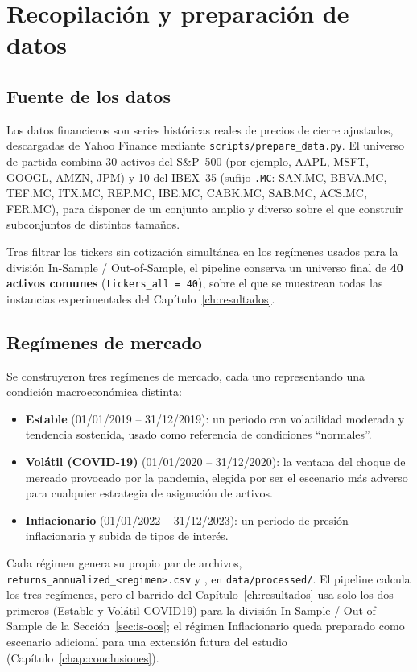 \section{Recopilación y preparación de datos}
\label{sec:datos}

\subsection{Fuente de los datos}

Los datos financieros son series históricas reales de precios de cierre ajustados, descargadas de Yahoo Finance mediante \texttt{scripts/prepare\_data.py}. El universo de partida combina 30 activos del S\&P~500 (por ejemplo, AAPL, MSFT, GOOGL, AMZN, JPM) y 10 del IBEX~35 (sufijo \texttt{.MC}: SAN.MC, BBVA.MC, TEF.MC, ITX.MC, REP.MC, IBE.MC, CABK.MC, SAB.MC, ACS.MC, FER.MC), para disponer de un conjunto amplio y diverso sobre el que construir subconjuntos de distintos tamaños.

Tras filtrar los tickers sin cotización simultánea en los regímenes usados para la división In-Sample / Out-of-Sample, el pipeline conserva un universo final de \textbf{40 activos comunes} (\texttt{tickers\_all = 40}), sobre el que se muestrean todas las instancias experimentales del Capítulo~\ref{ch:resultados}.

\subsection{Regímenes de mercado}

Se construyeron tres regímenes de mercado, cada uno representando una condición macroeconómica distinta:

\begin{itemize}
    \item \textbf{Estable} (01/01/2019 -- 31/12/2019): un periodo con volatilidad moderada y tendencia sostenida, usado como referencia de condiciones ``normales''.
    \item \textbf{Volátil (COVID-19)} (01/01/2020 -- 31/12/2020): la ventana del choque de mercado provocado por la pandemia, elegida por ser el escenario más adverso para cualquier estrategia de asignación de activos.
    \item \textbf{Inflacionario} (01/01/2022 -- 31/12/2023): un periodo de presión inflacionaria y subida de tipos de interés.
\end{itemize}

Cada régimen genera su propio par de archivos, \texttt{returns\_annualized\_<regimen>.csv} y \texttt{}, en \texttt{data/processed/}. El pipeline calcula los tres regímenes, pero el barrido del Capítulo~\ref{ch:resultados} usa solo los dos primeros (Estable y Volátil-COVID19) para la división In-Sample / Out-of-Sample de la Sección~\ref{sec:is-oos}; el régimen Inflacionario queda preparado como escenario adicional para una extensión futura del estudio (Capítulo~\ref{chap:conclusiones}).

